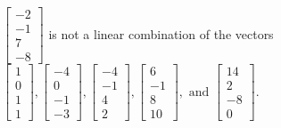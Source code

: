 \begin{exercise}
\begin{exerciseStatement}
  \end{exerciseStatement}
  \begin{exerciseAnswer}
   \(\left[\begin{array}{c}
-2 \\
-1 \\
7 \\
-8
\end{array}\right]\) 
  	 is not  
	a linear combination of the vectors \(\left[\begin{array}{c}
1 \\
0 \\
1 \\
1
\end{array}\right] , \left[\begin{array}{c}
-4 \\
0 \\
-1 \\
-3
\end{array}\right] , \left[\begin{array}{c}
-4 \\
-1 \\
4 \\
2
\end{array}\right] , \left[\begin{array}{c}
6 \\
-1 \\
8 \\
10
\end{array}\right] , \text{ and } \left[\begin{array}{c}
14 \\
2 \\
-8 \\
0
\end{array}\right]\).

	
  


  \end{exerciseAnswer}
\end{exercise}